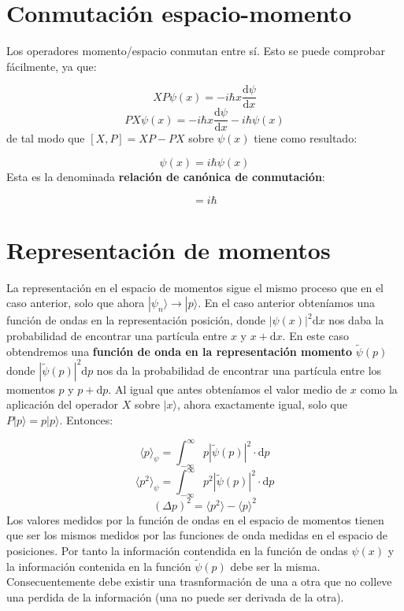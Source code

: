 \documentclass[12pt]{book}
\numberwithin{equation}{chapter}
\numberwithin{figure}{chapter}
\newcommand{\D}{\mathrm{d}}
\newcommand{\derivadas}[2]{\frac{\D #1}{\D #2}}
\newcommand{\intinf}{\int_{-\infty}^{\infty}}
\begin{document}
\section{Conmutación espacio-momento}

Los operadores momento/espacio conmutan entre sí. Esto se puede comprobar fácilmente, ya que:

\begin{equation}
XP \psi (x) = - i \hbar x \derivadas{\psi}{x}
\end{equation}
\begin{equation}
PX \psi (x) = - i \hbar x \derivadas{\psi}{x} - i \hbar \psi(x)
\end{equation}
de tal modo que $[X,P]=XP-PX$ sobre $\psi(x)$ tiene como resultado:

\begin{equation}
[X,P] \psi (x) =  i \hbar \psi (x)
\end{equation}
Esta es la denominada \textbf{relación de canónica de conmutación}:

\begin{equation}
[X,P] = i \hbar
\end{equation}


\section{Representación de momentos}

La representación en el espacio de momentos sigue el mismo proceso que en el caso anterior, solo que ahora $|\psi_n\rangle \rightarrow |p\rangle$. En el caso anterior obteníamos una  función de ondas en la representación posición, donde $|\psi (x) |^2 \D x$ nos daba la probabilidad de encontrar una partícula entre $x$ y $x+\D x$. En este caso obtendremos una \textbf{función de onda en la representación momento} $\tilde{\psi} (p)$ donde $|\tilde{\psi} (p) |^2 \D p$ nos da la probabilidad de encontrar una partícula entre los momentos $p$ y $p+\D p$. Al igual que antes obteníamos el valor medio de $x$ como la aplicación del operador $X$ sobre $|x\rangle$, ahora exactamente igual, solo que $P |p\rangle = p |p \rangle$. Entonces:


\begin{equation}
\langle p \rangle_\psi = \intinf p|\tilde{\psi} (p)|^2 \cdot \D p
\end{equation}
\begin{equation}
\langle p^2 \rangle_\psi = \intinf p^2 |\tilde{\psi}  (p)|^2 \cdot \D p
\end{equation}
\begin{equation}
(\Delta p)^2 = \langle p^2 \rangle - \langle p \rangle^2
\end{equation}
Los valores medidos por la función de ondas en el espacio de momentos tienen que ser los mismos medidos por las funciones de onda medidas en el espacio de posiciones. Por tanto la información contendida en la función de ondas $\psi(x)$ y la información contenida en la función $\tilde{\psi} (p)$ debe ser la misma. Consecuentemente debe existir una trasnformación de una a otra que no colleve una perdida de la información (una no puede ser derivada de la otra).
\end{document}
